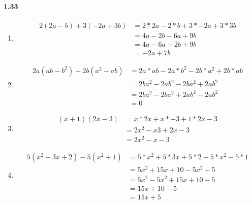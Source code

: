 \documentclass{article}
\newcommand\litem[1]{\item{\bfseries#1\space}}
\begin{document}
\paragraph{1.33}
\begin{enumerate}[label=\emph{\alph*})]
\litem{
\begin{align*}
  2(2a - b) + 3(-2a + 3b) &= 2 * 2a - 2 * b + 3 * -2a + 3 * 3b \\
  &= 4a - 2b - 6a + 9b \\
  &= 4a - 6a - 2b + 9b \\
  &= -2a + 7b
\end{align*}
}
\litem{
\begin{align*}
  2a(ab - b^2) - 2b(a^2 - ab) &= 2a * ab - 2a * b^2 - 2b * a^2 + 2b * ab \\
  &= 2ba^2 - 2ab^2 - 2ba^2 + 2ab^2 \\
  &= 2ba^2 - 2ba^2 + 2ab^2 - 2ab^2 \\
  &= 0
\end{align*}
}
\litem{
\begin{align*}
  (x + 1)(2x - 3) &= x * 2x + x * -3 + 1 * 2x - 3 \\
  &= 2x^2 - x3 + 2x - 3 \\
  &= 2x^2 - x - 3
\end{align*}
}
\litem{
\begin{align*}
  5(x^2 + 3x + 2) - 5(x^2 + 1) &= 5 * x^2 + 5 * 3x + 5 * 2 - 5 * x^2 - 5 * 1 \\
  &= 5x^2 + 15x + 10 - 5x^2 - 5 \\
  &= 5x^2 - 5x^2 + 15x + 10 - 5 \\
  &= 15x + 10 - 5 \\
  &= 15x + 5
\end{align*}
}
\end{enumerate}
\end{document}
